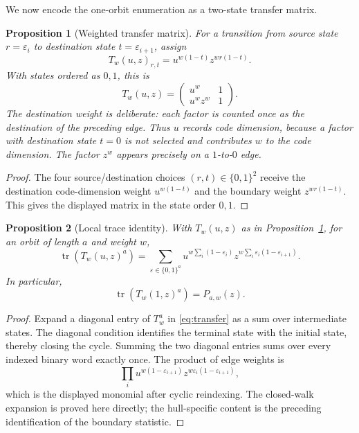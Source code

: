 \documentclass[11pt]{article}
\theoremstyle{plain}
\newtheorem{proposition}{Proposition}
\theoremstyle{definition}
\theoremstyle{remark}
\begin{document}
We now encode the one-orbit enumeration as a two-state transfer matrix.

\begin{proposition}[Weighted transfer matrix]\label{prop:transfer-matrix}
For a transition from source state $r=\varepsilon_i$ to destination state $t=\varepsilon_{i+1}$, assign
\[
T_w(u,z)_{r,t}=u^{w(1-t)}z^{wr(1-t)}.
\]
With states ordered as $0,1$, this is
\begin{equation}\label{eq:transfer}
T_w(u,z)=\begin{pmatrix}u^w&1\\u^wz^w&1\end{pmatrix}.
\end{equation}
The destination weight is deliberate: each factor is counted once as the destination of the preceding edge. Thus $u$ records code dimension, because a factor with destination state $t=0$ is not selected and contributes $w$ to the code dimension. The factor $z^w$ appears precisely on a $1$-to-$0$ edge.
\end{proposition}

\begin{proof}
The four source/destination choices $(r,t)\in\{0,1\}^2$ receive the destination code-dimension weight $u^{w(1-t)}$ and the boundary weight $z^{wr(1-t)}$. This gives the displayed matrix in the state order $0,1$.
\end{proof}

\begin{proposition}[Local trace identity]\label{prop:trace}
With $T_w(u,z)$ as in Proposition~\ref{prop:transfer-matrix}, for an orbit of length $a$ and weight $w$,
\begin{equation}\label{eq:trace}
\operatorname{tr}(T_w(u,z)^a)
 =\sum_{\varepsilon\in\{0,1\}^a}
 u^{w\sum_i(1-\varepsilon_i)}z^{w\sum_i\varepsilon_i(1-\varepsilon_{i+1})}.
\end{equation}
In particular,
\[
\operatorname{tr}(T_w(1,z)^a)=P_{a,w}(z).
\]
\end{proposition}

\begin{proof}
Expand a diagonal entry of $T_w^a$ in \eqref{eq:transfer} as a sum over intermediate states. The diagonal condition identifies the terminal state with the initial state, thereby closing the cycle. Summing the two diagonal entries sums over every indexed binary word exactly once. The product of edge weights is
\[
\prod_i u^{w(1-\varepsilon_{i+1})}z^{w\varepsilon_i(1-\varepsilon_{i+1})},
\]
which is the displayed monomial after cyclic reindexing. The closed-walk expansion is proved here directly; the hull-specific content is the preceding identification of the boundary statistic.
\end{proof}
\end{document}
